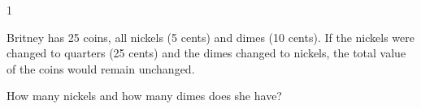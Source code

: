 
\AddToShipoutPicture*{\BackgroundPic}

\addtocounter {ProbNum} {1}

 
{\bf \Large{}} Britney has 25 coins, all nickels (5 cents) and dimes (10 cents). If the nickels were changed to quarters (25 cents) and the dimes changed to nickels, the total value of the coins would remain unchanged. 

\bigskip

\indent How many nickels and how many dimes does she have? 

\vfill

\newpage
